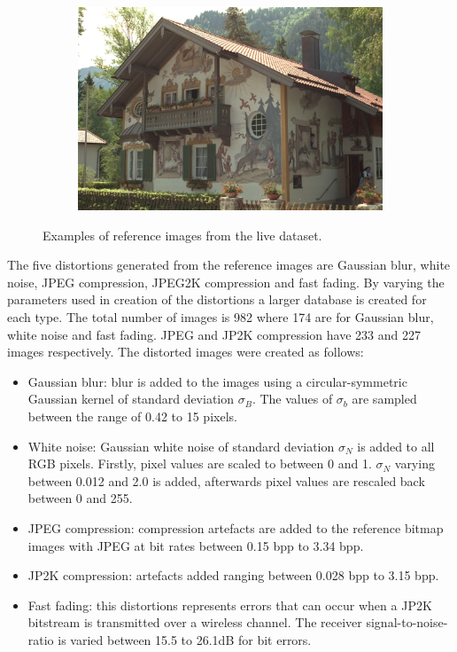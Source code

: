 \begin{figure}[H]
\begin{subfigure}[b]{0.4\textwidth}
        \caption{}\label{fig:}
    \end{subfigure}
    \begin{subfigure}[b]{0.4\textwidth}
	    \center
	    \includegraphics[width=\textwidth]{Figs/Implementation/paintedhouse.pdf}
	    \caption{}\label{fig:}
    \end{subfigure}
    \caption{Examples of reference images from the \gls{live} dataset.}
    \label{fig:live_ex}
\end{figure} 

The five distortions generated from the reference images are Gaussian blur, white noise, JPEG compression, JPEG2K compression and fast fading. By varying the parameters used in creation of the distortions a larger database is created for each type. The total number of images is 982 where 174 are for Gaussian blur, white noise and fast fading. JPEG and JP2K compression have 233 and 227 images respectively. The distorted images were created as follows:

\begin{itemize}
	\item Gaussian blur: blur is added to the images using a circular-symmetric Gaussian kernel of standard deviation $\sigma_B$. The values of $\sigma_b$ are sampled between the range of 0.42 to 15 pixels.
	\item White noise: Gaussian white noise of standard deviation $\sigma_N$ is added to all RGB pixels. Firstly, pixel values are scaled to between 0 and 1. $\sigma_N$ varying between 0.012 and 2.0 is added, afterwards pixel values are rescaled back between 0 and 255.
	\item JPEG compression: compression artefacts are added to the reference bitmap images with JPEG at bit rates between 0.15 \gls{bpp} to 3.34 \gls{bpp}.
	\item JP2K compression: artefacts added ranging between 0.028 \gls{bpp} to 3.15 \gls{bpp}.
	\item Fast fading: this distortions represents errors that can occur when a JP2K bitstream is transmitted over a wireless channel. The receiver signal-to-noise-ratio is varied between 15.5 to 26.1dB for bit errors.
\end{itemize}

